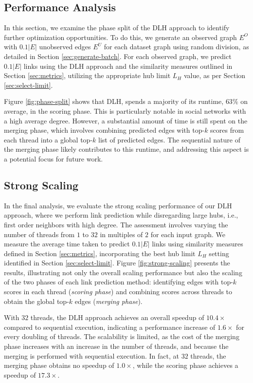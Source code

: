 \subsection{Performance Analysis}

In this section, we examine the phase split of the DLH approach to identify further optimization opportunities. To do this, we generate an observed graph $E^O$ with $0.1|E|$ unobserved edges $E^U$ for each dataset graph using random division, as detailed in Section \ref{sec:generate-batch}. For each observed graph, we predict $0.1|E|$ links using the DLH approach and the similarity measures outlined in Section \ref{sec:metrics}, utilizing the appropriate hub limit $L_H$ value, as per Section \ref{sec:select-limit}.

Figure \ref{fig:phase-split} shows that DLH, spends a majority of its runtime, $63\%$ on average, in the scoring phase. This is particularly notable in social networks with a high average degree. However, a substantial amount of time is still spent on the merging phase, which involves combining predicted edges with top-$k$ scores from each thread into a global top-$k$ list of predicted edges. The sequential nature of the merging phase likely contributes to this runtime, and addressing this aspect is a potential focus for future work.




\subsection{Strong Scaling}

In the final analysis, we evaluate the strong scaling performance of our DLH approach, where we perform link prediction while disregarding large hubs, i.e., first order neighbors with high degree. The assessment involves varying the number of threads from $1$ to $32$ in multiples of $2$ for each input graph. We measure the average time taken to predict $0.1|E|$ links using similarity measures defined in Section \ref{sec:metrics}, incorporating the best hub limit $L_H$ setting identified in Section \ref{sec:select-limit}. Figure \ref{fig:strong-scaling} presents the results, illustrating not only the overall scaling performance but also the scaling of the two phases of each link prediction method: identifying edges with top-$k$ scores in each thread (\textit{scoring phase}) and combining scores across threads to obtain the global top-$k$ edges (\textit{merging phase}).

With $32$ threads, the DLH approach achieves an overall speedup of $10.4\times$ compared to sequential execution, indicating a performance increase of $1.6\times$ for every doubling of threads. The scalability is limited, as the cost of the merging phase increases with an increase in the number of threads, and because the merging is performed with sequential execution. In fact, at $32$ threads, the merging phase obtains no speedup of $1.0\times$, while the scoring phase achieves a speedup of $17.3\times$.
